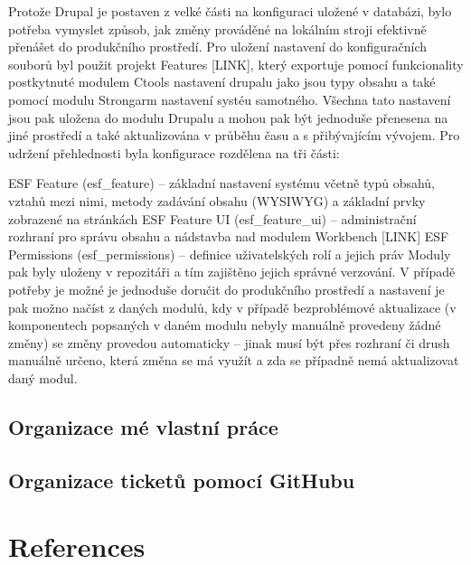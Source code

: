 \documentclass[11pt,draft,oneside]{fithesis2}
\begin{document}
Protože Drupal je postaven z velké části na konfiguraci uložené v databázi, bylo potřeba vymyslet způsob, jak změny prováděné na lokálním stroji efektivně přenášet do produkčního prostředí. Pro uložení nastavení do konfiguračních souborů byl použit projekt Features [LINK], který exportuje pomocí funkcionality postkytnuté modulem Ctools nastavení drupalu jako jsou typy obsahu a také pomocí modulu Strongarm nastavení systéu samotného. Všechna tato nastavení jsou pak uložena do modulu Drupalu a mohou pak být jednoduše přenesena na jiné prostředí a také aktualizována v průběhu času a s přibývajícím vývojem. Pro udržení přehlednosti byla konfigurace rozdělena na tři části:

ESF Feature (esf\_feature) – základní nastavení systému včetně typů obsahů, vztahů mezi nimi, metody zadávání obsahu (WYSIWYG) a základní prvky zobrazené na stránkách
ESF Feature UI (esf\_feature\_ui) – administrační rozhraní pro správu obsahu a nádstavba nad modulem Workbench [LINK]
ESF Permissions (esf\_permissions) – definice uživatelských rolí a jejich práv
Moduly pak byly uloženy v repozitáři a tím zajištěno jejich správné verzování. V případě potřeby je možné je jednoduše doručit do produkčního prostředí a nastavení je pak možno načíst z daných modulů, kdy v případě bezproblémové aktualizace (v komponentech popsaných v daném modulu nebyly manuálně provedeny žádné změny) se změny provedou automaticky – jinak musí být přes rozhraní či drush manuálně určeno, která změna se má využít a zda se případně nemá aktualizovat daný modul.

\section{Organizace mé vlastní práce}

\section{Organizace ticketů pomocí GitHubu}

\printindex
\listoffigures
\listoftables

\begingroup
\def\tmpchapter{0}
\renewcommand{\chaptername}{}
\renewcommand{\thechapter}{}
\chapter{References}
\renewcommand{\chapter}[2]{}%




\endgroup

\appendix

\end{document}
